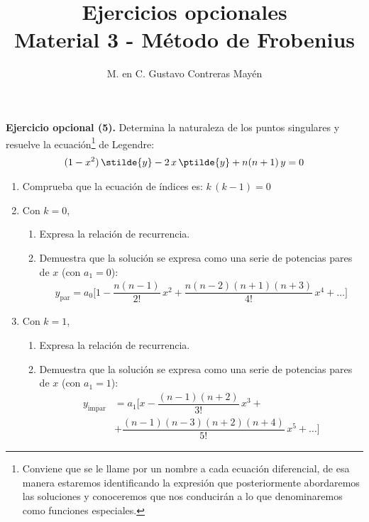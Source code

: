 
\title{Ejercicios opcionales \\[0.3em]  \large{Material 3 - Método de Frobenius} \vspace{-3ex}}
\author{M. en C. Gustavo Contreras Mayén}
\date{ }


\vspace{-4cm}
\maketitle
\fontsize{14}{14}\selectfont


\noindent
\textbf{Ejercicio opcional (5).} Determina la naturaleza de los puntos singulares y resuelve la ecuación\footnote{Conviene que se le llame por un nombre a cada ecuación diferencial, de esa manera estaremos identificando la expresión que posteriormente abordaremos las soluciones y conoceremos que nos conducirán a lo que denominaremos como funciones especiales.} de Legendre:
\begin{align*}
(1 -x^{2}) \, \stilde{y} -  2 \, x \, \ptilde{y} + n(n + 1) \, y = 0
\end{align*}
\begin{enumerate}
\item Comprueba que la ecuación de índices es: $k \, (k - 1) = 0$
\item Con $k = 0$, 
\begin{enumerate}
\item Expresa la relación de recurrencia.
\item Demuestra que la solución se expresa como una serie de potencias pares de $x$ (con $a_{1} = 0$):
\begin{align*}
    y_{\mbox{par}} = a_{0} \bigg[ 1 - \dfrac{n (n - 1)}{2!} \, x^{2} + \dfrac{n (n - 2)(n + 1)(n + 3)}{4!} \, x^{4} + \ldots \bigg]
\end{align*}
\end{enumerate}
\item Con $k = 1$, 
\begin{enumerate}
\item Expresa la relación de recurrencia.
\item Demuestra que la solución se expresa como una serie de potencias pares de $x$ (con $a_{1} = 1$):
\begin{align*}
y_{\mbox{impar}} &= a_{1} \bigg[ x - \dfrac{(n - 1)(n + 2)}{3!} \, x^{3} + \\[0.5em] 
&+ \dfrac{(n - 1)(n - 3)(n + 2)(n + 4)}{5!} \, x^{5} + \ldots \bigg]
\end{align*}
\end{enumerate}
\end{enumerate}


